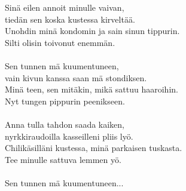 
            Sinä eilen annoit minulle vaivan, \\
            tiedän sen koska kustessa kirveltää.  \\
            Unohdin minä kondomin ja sain sinun tippurin. \\
            Silti olisin toivonut enemmän. \\
\hspace{10mm} \\
            Sen tunnen mä kuumentuneen,  \\
            vain kivun kanssa saan mä stondiksen.  \\
            Minä teen, sen mitäkin, mikä sattuu haaroihin.  \\
            Nyt tungen pippurin peenikseen. \\
\hspace{10mm} \\
            Anna tulla tahdon saada kaiken,  \\
            nyrkkiraudoilla kasseilleni pliis lyö.  \\
            Chilikäsilläni kustessa, minä parkaisen tuskasta.  \\
            Tee minulle sattuva lemmen yö. \\
\hspace{10mm} \\
            Sen tunnen mä kuumentuneen... \\
